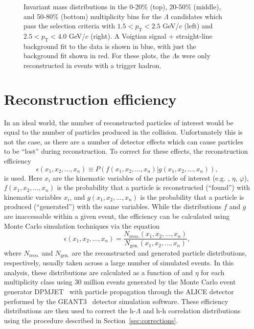 \begin{figure}[ht]
\begin{minipage}{0.48\textwidth}
	\end{minipage}
	\caption{Invariant mass distributions in the 0-20\% (top), 20-50\% (middle), and 50-80\% (bottom) multiplicity bins for the $\Lambda$ candidates which pass the selection criteria with $1.5 < p_{\text{T}} < 2.5$ GeV/$c$ (left) and $2.5 < p_{\text{T}} < 4.0$ GeV/$c$ (right). A Voigtian signal + straight-line background fit to the data is shown in blue, with just the background fit shown in red. For these plots, the $\Lambda$s were only reconstructed in events with a trigger hadron.} 
	\label{fig:lambda_mass}
\end{figure}

\clearpage

\section{Reconstruction efficiency}
\label{sec:reconstruction_efficiency}

In an ideal world, the number of reconstructed particles of interest would be equal to the number of particles produced in the collision. Unfortunately this is not the case, as there are a number of detector effects which can cause particles to be ``lost'' during reconstruction. To correct for these effects, the reconstruction efficiency
%
\begin{equation}
	\epsilon(x_1, x_2, ..., x_n) \equiv P(f(x_1, x_2, ..., x_n) | g(x_1, x_2, ..., x_n)),
	\label{eq:efficiency_th}
\end{equation}
%
is used. Here $x_i$ are the kinematic variables of the particle of interest (e.g. \pt, $\eta$, $\varphi$), $f(x_1, x_2, ..., x_n)$ is the probability that a particle is reconstructed (``found'') with kinematic variables $x_i$, and $g(x_1, x_2, ..., x_n)$ is the probability that a particle is produced (``generated'') with the same variables. While the distributions $f$ and $g$ are inaccessable within a given event, the efficiency can be calculated using Monte Carlo simulation techniques via the equation
%
\begin{equation}
	\epsilon(x_1, x_2, ..., x_n) = \frac{N_{\text{reco.}}(x_1, x_2, ..., x_n)}{N_{\text{gen.}}(x_1, x_2, ..., x_n)},
	\label{eq:efficiency_exp}
\end{equation}
%
where $N_{\text{reco.}}$ and $N_{\text{gen.}}$ are the reconstructed and generated particle distributions, respectively, usually taken across a large number of simulated events. In this analysis, these distributions are calculated as a function of \pt and $\eta$ for each multiplicity class using 30 million events generated by the Monte Carlo event generator DPMJET~\cite{DPMJET} with particle propagation through the ALICE detector performed by the GEANT3~\cite{GEANT} detector simulation software. These efficiency distributions are then used to correct the h-$\Lambda$ and h-h correlation distributions using the procedure described in Section~\ref{sec:corrections}.

